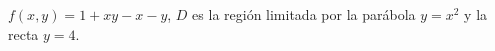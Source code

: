 \item $f(x, y) = 1 + xy - x - y$, $D$ es la región limitada por la parábola $y = x^2$ y la recta $y = 4$.
